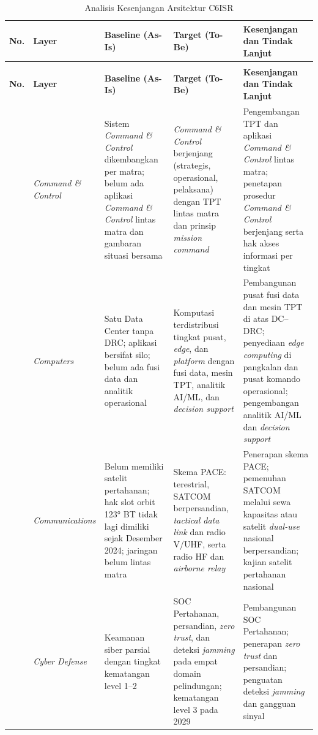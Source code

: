 {\small
\begin{longtable}{@{}>{\raggedright\arraybackslash}p{}>{\raggedright\arraybackslash}p{}>{\raggedright\arraybackslash}p{}>{\raggedright\arraybackslash}p{}>{\raggedright\arraybackslash}p{}@{}}
\caption{Analisis Kesenjangan Arsitektur C6ISR}
\label{tab:d4-35}\\
\toprule
\textbf{No.} & \textbf{Layer} & \textbf{Baseline (As-Is)} & \textbf{Target (To-Be)} & \textbf{Kesenjangan dan Tindak Lanjut}\\
\midrule
\endfirsthead
\multicolumn{5}{@{}l}{\small\itshape \tablename\ \thetable{} (lanjutan)}\\
\toprule
\textbf{No.} & \textbf{Layer} & \textbf{Baseline (As-Is)} & \textbf{Target (To-Be)} & \textbf{Kesenjangan dan Tindak Lanjut}\\
\midrule
\endhead
\bottomrule
\endlastfoot
1 & \textit{Command \& Control} & Sistem \textit{Command \& Control} dikembangkan per matra; belum ada aplikasi \textit{Command \& Control} lintas matra dan gambaran situasi bersama & \textit{Command \& Control} berjenjang (strategis, operasional, pelaksana) dengan TPT lintas matra dan prinsip \textit{mission command} & Pengembangan TPT dan aplikasi \textit{Command \& Control} lintas matra; penetapan prosedur \textit{Command \& Control} berjenjang serta hak akses informasi per tingkat\\
2 & \textit{Computers} & Satu Data Center tanpa DRC; aplikasi bersifat silo; belum ada fusi data dan analitik operasional & Komputasi terdistribusi tingkat pusat, \textit{edge}, dan \textit{platform} dengan fusi data, mesin TPT, analitik AI/ML, dan \textit{decision support} & Pembangunan pusat fusi data dan mesin TPT di atas DC–DRC; penyediaan \textit{edge computing} di pangkalan dan pusat komando operasional; pengembangan analitik AI/ML dan \textit{decision support}\\
3 & \textit{Communications} & Belum memiliki satelit pertahanan; hak slot orbit 123° BT tidak lagi dimiliki sejak Desember 2024; jaringan belum lintas matra & Skema PACE: terestrial, SATCOM berpersandian, \textit{tactical data link} dan radio V/UHF, serta radio HF dan \textit{airborne relay} & Penerapan skema PACE; pemenuhan SATCOM melalui sewa kapasitas atau satelit \textit{dual-use} nasional berpersandian; kajian satelit pertahanan nasional\\
4 & \textit{Cyber Defense} & Keamanan siber parsial dengan tingkat kematangan level 1–2 & SOC Pertahanan, persandian, \textit{zero trust}, dan deteksi \textit{jamming} pada empat domain pelindungan; kematangan level 3 pada 2029 & Pembangunan SOC Pertahanan; penerapan \textit{zero trust} dan persandian; penguatan deteksi \textit{jamming} dan gangguan sinyal\\

\end{longtable}}
